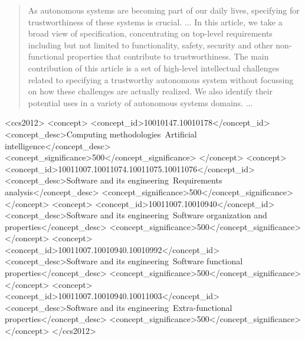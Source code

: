 \documentclass[sigconf]{acmart}
\begin{document}
\renewcommand{\shortauthors}{Author name, et al.}

\begin{abstract}
As autonomous systems are becoming part of our daily lives, specifying for trustworthiness of these systems is crucial. ...
In this article, we take a broad view of specification, concentrating on top-level requirements including but not limited to functionality, safety, security and other non-functional properties that contribute to trustworthiness. 
The main contribution of this article is a set of high-level intellectual challenges related to specifying a trustworthy autonomous system without focussing on how these challenges are actually realized. We also identify their potential uses in a variety of autonomous systems domains. ...
\end{abstract}

\begin{CCSXML}
	<ccs2012>
	<concept>
	<concept_id>10010147.10010178</concept_id>
	<concept_desc>Computing methodologies~Artificial intelligence</concept_desc>
	<concept_significance>500</concept_significance>
	</concept>
	<concept>
	<concept_id>10011007.10011074.10011075.10011076</concept_id>
	<concept_desc>Software and its engineering~Requirements analysis</concept_desc>
	<concept_significance>500</concept_significance>
	</concept>
	<concept>
	<concept_id>10011007.10010940</concept_id>
	<concept_desc>Software and its engineering~Software organization and properties</concept_desc>
	<concept_significance>500</concept_significance>
	</concept>
	<concept>
	<concept_id>10011007.10010940.10010992</concept_id>
	<concept_desc>Software and its engineering~Software functional properties</concept_desc>
	<concept_significance>500</concept_significance>
	</concept>
	<concept>
	<concept_id>10011007.10010940.10011003</concept_id>
	<concept_desc>Software and its engineering~Extra-functional properties</concept_desc>
	<concept_significance>500</concept_significance>
	</concept>
	</ccs2012>
\end{CCSXML}
\end{document}
